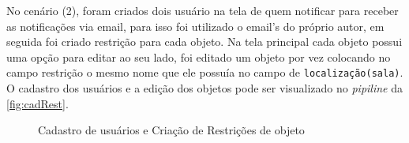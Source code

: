 \par
No cenário (2), foram criados dois usuário na tela de quem notificar para receber as notificações via email, para isso foi utilizado o email's do próprio autor, em seguida foi criado restrição para cada objeto. Na tela principal cada objeto possui uma opção para editar ao seu lado, foi editado um objeto por vez colocando no campo restrição o mesmo nome que ele possuía no campo de \texttt{localização(sala)}. O cadastro dos usuários e a edição dos objetos pode ser visualizado no \textit{pipiline} da \autoref{fig:cadRest}.

\begin{figure}[ht]
        \centering\caption{Cadastro de usuários e Criação de Restrições de objeto}
        \label{fig:cadRest}
         \hspace{0.5cm}
             \hspace{0.5cm}
        \hspace{0.5cm}
             \hspace{0.5cm}
              \hspace{0.5cm}
\end{figure}
